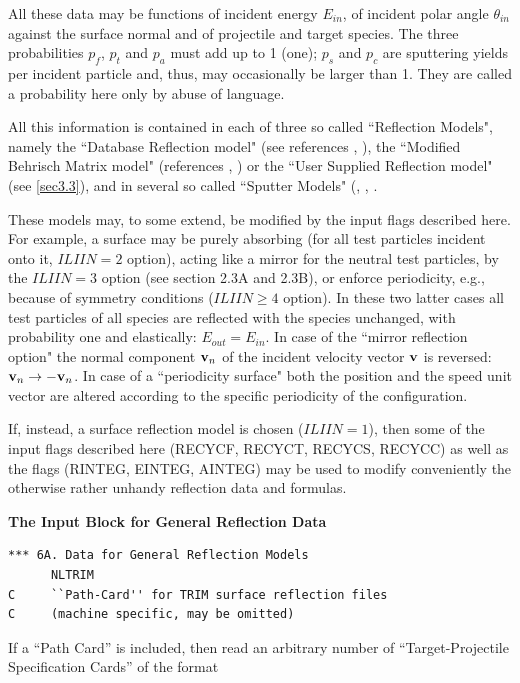 All these data may be functions of incident energy $E_{in}$, of incident polar
angle $\theta_{in}$ against the surface normal and of projectile and target
species.
The three probabilities $p_f$, $p_t$ and $p_a$ must add up to 1 (one); $p_s$
and $p_c$ are sputtering yields per incident particle and, thus, may
occasionally be larger than 1.
They are called a probability here only by abuse of language.

All this information is contained in each of three so called ``Reflection
Models", namely the ``Database Reflection model" (see references
\cite{kn:Eckstein}, \cite{kn:Bateman}), the ``Modified Behrisch Matrix model"
(references \cite{kn:Behrisch}, \cite{kn:Nicolai}) or the ``User Supplied
Reflection model" (see \cref{sec3.3}), and in several so called ``Sputter
Models" (\cite{kn:NucFus}, \cite{kn:Sputer95}, \cite{kn:Roth96}.

These models may, to some extend, be modified by the input flags described
here.
For example, a surface may be purely absorbing (for all test particles incident
onto it, $ILIIN = 2$ option), acting like a mirror for the neutral test
particles, by the $ILIIN = 3$ option (see section 2.3A and 2.3B), or enforce
periodicity, e.g., because of symmetry conditions ($ILIIN \ge 4$ option).
In these two latter cases all test particles of all species are reflected with
the species unchanged, with probability one and elastically:
$E_{out} = E_{in}$.
In case of the ``mirror reflection option" the normal component $\mathbf{v}_n$ of the
incident velocity vector $\mathbf{v}$ is reversed: $\mathbf{v}_n \rightarrow -\mathbf{v}_n$.
In case of a ``periodicity surface" both the position and the speed unit vector
are altered according to the specific periodicity of the configuration.

If, instead, a surface reflection model is chosen ($ILIIN = 1$), then some of
the input flags described here (RECYCF, RECYCT, RECYCS, RECYCC) as well as the
flags (RINTEG, EINTEG, AINTEG) may be used to modify conveniently the otherwise
rather unhandy reflection data and formulas.

\medskip

\textbf{The Input Block for General Reflection Data} 

\begin{lstlisting}
*** 6A. Data for General Reflection Models
      NLTRIM
C     ``Path-Card'' for TRIM surface reflection files
C     (machine specific, may be omitted)
\end{lstlisting} 

If a ``Path Card'' is included, then read an arbitrary number of
``Target-Projectile Specification Cards'' of the format 

